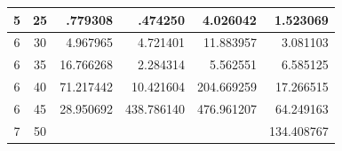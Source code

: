 \begin{table}
\begin{tabular}{|c|c|r|r|r|r|}
	5                                                        & 25                                                      & .779308                         & .474250                                                                              & 4.026042                                                                                 & 1.523069                                                                      \\ \hline
	6                                                        & 30                                                      & 4.967965                         & 4.721401                                                                              & 11.883957                                                                                & 3.081103                                                                      \\ \hline
	6                                                        & 35                                                      & 16.766268                        & 2.284314                                                                             & 5.562551                                                                                & 6.585125                                                                      \\ \hline
	6                                                        & 40                                                      & 71.217442                        & 10.421604                                                                            & 204.669259                                                                               & 17.266515                                                                     \\ \hline
	6                                                        & 45                                                      & 28.950692                       & 438.786140                                                                            & 476.961207                                                                               & 64.249163                                                                     \\ \hline
	7                                                        & 50                                                      &                                  &                                                                                       &                                                                                          & 134.408767                                                                    \\ \hline
	\end{tabular}
\end{table}

